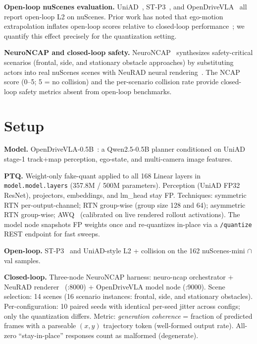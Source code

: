 \documentclass[conference]{IEEEtran}
\begin{document}
\textbf{Open-loop nuScenes evaluation.}
UniAD~\cite{uniad}, ST-P3~\cite{stp3}, and OpenDriveVLA~\cite{opendrivevla} all report open-loop
L2 on nuScenes. Prior work has noted that ego-motion extrapolation inflates open-loop scores
relative to closed-loop performance~\cite{closed_loop_critique}; we quantify this effect precisely
for the quantization setting.

\textbf{NeuroNCAP and closed-loop safety.}
NeuroNCAP~\cite{neuroncap} synthesizes safety-critical scenarios (frontal, side, and stationary
obstacle approaches) by substituting actors into real nuScenes scenes with NeuRAD neural
rendering~\cite{neurad}. The NCAP score (0--5; 5 = no collision) and the per-scenario collision
rate provide closed-loop safety metrics absent from open-loop benchmarks.

\section{Setup}
\label{sec:setup}

\textbf{Model.} OpenDriveVLA-0.5B~\cite{opendrivevla}: a Qwen2.5-0.5B planner conditioned on
UniAD stage-1 track+map perception, ego-state, and multi-camera image features.

\textbf{PTQ.} Weight-only fake-quant applied to all 168 Linear layers in
\texttt{model.model.layers} (357.8M / 500M parameters). Perception (UniAD FP32 ResNet),
projectors, embeddings, and lm\_head stay FP. Techniques: symmetric RTN per-output-channel;
RTN group-wise (group size 128 and 64); asymmetric RTN group-wise; AWQ~\cite{awq}
(calibrated on live rendered rollout activations). The model node snapshots FP weights once and
re-quantizes in-place via a \texttt{/quantize} REST endpoint for fast sweeps.

\textbf{Open-loop.} ST-P3~\cite{stp3} and UniAD-style L2 + collision on the 162 nuScenes-mini
$\cap$ val samples.

\textbf{Closed-loop.} Three-node NeuroNCAP harness: neuro-ncap orchestrator $+$ NeuRAD
renderer~\cite{neurad} (:8000) $+$ OpenDriveVLA model node (:9000). Scene selection: 14 scenes
(16 scenario instances: frontal, side, and stationary obstacles). Per-configuration: 10 paired
seeds with identical per-seed jitter across configs; only the quantization differs. Metric:
\emph{generation coherence} = fraction of predicted frames with a parseable $(x,y)$ trajectory
token (well-formed output rate). All-zero ``stay-in-place'' responses count as malformed
(degenerate).
\end{document}
